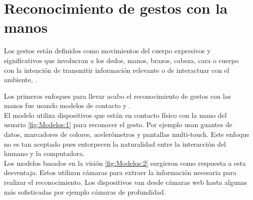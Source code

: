 \section{Reconocimiento de gestos con la manos}\label{sec:ReconocimientoGestos} 

Los gestos están definidos como movimientos del cuerpo expresivos y significativos que involucran a los dedos, manos, brazos, cabeza, cara o cuerpo con la intención de transmitir información relevante o de interactuar con el ambiente, \citep{Mitra2007}.

Los primeros enfoques para llevar acabo el reconocimiento de gestos con las manos fue usando modelos de contacto \citep{Rautaray2012} y \citep{Nayakwadi2014}.\\
El modelo utiliza dispositivos que est\'an en contacto f\'isico con la mano del usuario \ref{fig:Modelos:1} para reconocer el gesto. Por ejemplo usan guantes de datos, marcadores de colores, acelerómetros y pantallas multi-touch. Este enfoque no es  tan aceptado pues entorpecen la naturalidad entre la interacción del humano y la computadora.\\
Los modelos basados en la visión \ref{fig:Modelos:2} surgieron como respuesta a esta desventaja. Estos utilizan cámaras para extraer la información necesaria para realizar el reconocimiento. Los dispositivos van desde cámaras web hasta algunas más sofisticadas por ejemplo c\'amaras de profundidad.   

